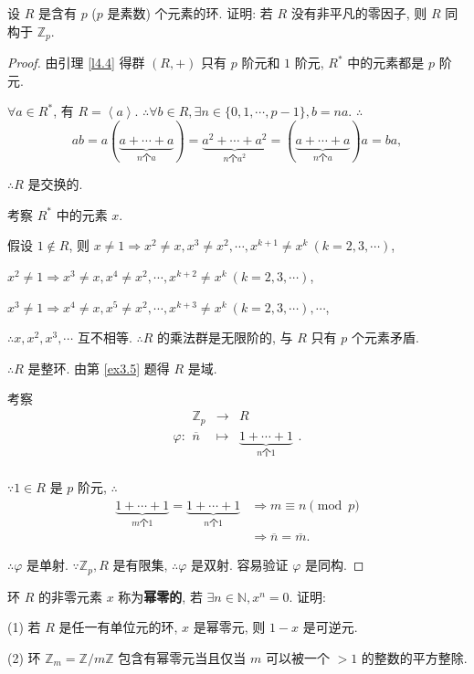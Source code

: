 \documentclass[color=black,device=normal,lang=cn,mode=geye]{elegantnote}
\begin{document}
\begin{exercise}[有修改]%
    设 $R$ 是含有 $p$ ($p$ 是素数) 个元素的环. 证明: 若 $R$ 没有非平凡的零因子, 则 $R$ 同构于 $\mathbb{Z}_p$.
\end{exercise}
\begin{proof}
    由引理 \ref{l4.4} 得群 $(R,+)$ 只有 $p$ 阶元和 $1$ 阶元, $R^*$ 中的元素都是 $p$ 阶元.
    
    $\forall a\in R^*$, 有 $R=\left<a\right>$. $\therefore\forall b\in R,\exists n\in\{0,1,\cdots,p-1\},b=na$. $\therefore$
    \[ab=a(\underbrace{a+\cdots+a}_{n\text{个}a})=\underbrace{a^2+\cdots+a^2}_{n\text{个}a^2}=(\underbrace{a+\cdots+a}_{n\text{个}a})a=ba,\]

    $\therefore R$ 是交换的.

    考察 $R^*$ 中的元素 $x$.

    假设 $1\notin R$, 则 $x\neq 1\Rightarrow x^2\neq x,x^3\neq x^2,\cdots,x^{k+1}\neq x^k\ (k=2,3,\cdots)$,

    $x^2\neq 1\Rightarrow x^3\neq x,x^4\neq x^2,\cdots,x^{k+2}\neq x^k\ (k=2,3,\cdots)$,

    $x^3\neq 1\Rightarrow x^4\neq x,x^5\neq x^2,\cdots,x^{k+3}\neq x^k\ (k=2,3,\cdots),\cdots$,

    $\therefore x,x^2,x^3,\cdots$ 互不相等. $\therefore R$ 的乘法群是无限阶的, 与 $R$ 只有 $p$ 个元素矛盾.

    $\therefore R$ 是整环. 由第 \ref{ex3.5} 题得 $R$ 是域.

    考察
    \[\varphi:\begin{array}{rcl}
        \mathbb{Z}_p & \to & R \\
        \overline{n} & \mapsto & \underbrace{1+\cdots+1}_{n\text{个}1} \\
    \end{array}.\]

    $\because 1\in R$ 是 $p$ 阶元, $\therefore$
    \begin{align*}
        \underbrace{1+\cdots+1}_{m\text{个}1}=\underbrace{1+\cdots+1}_{n\text{个}1} & \Rightarrow m\equiv n\pmod{p} \\
        & \Rightarrow\overline{n}=\overline{m}.
    \end{align*}

    $\therefore\varphi$ 是单射. $\because\mathbb{Z}_p,R$ 是有限集, $\therefore\varphi$ 是双射. 容易验证 $\varphi$ 是同构.
\end{proof}
\begin{exercise}%
    环 $R$ 的非零元素 $x$ 称为\textbf{幂零的}, 若 $\exists n\in\mathbb{N},x^n=0$. 证明:

    (1) 若 $R$ 是任一有单位元的环, $x$ 是幂零元, 则 $1-x$ 是可逆元.

    (2) 环 $\mathbb{Z}_m=\mathbb{Z}/m\mathbb{Z}$ 包含有幂零元当且仅当 $m$ 可以被一个 $>1$ 的整数的平方整除.
\end{exercise}
\end{document}
